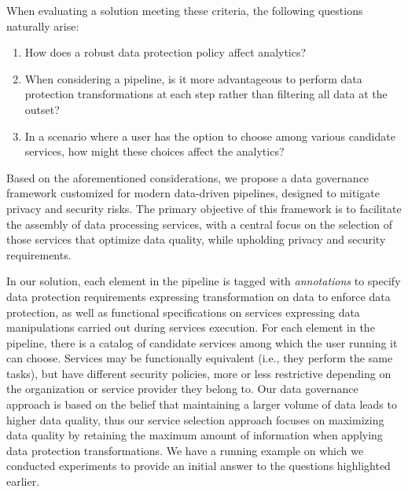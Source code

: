 When evaluating a solution meeting these criteria, the following questions naturally arise:
\begin{enumerate}
\item How does a robust data protection policy affect analytics?
\item When considering a pipeline, is it more advantageous to perform data protection transformations at each step rather than filtering all data at the outset? 
\item In a scenario where a user has the option to choose among various candidate services, how might these choices affect the analytics?
\end{enumerate}
%
Based on the aforementioned considerations, we propose a data governance framework customized for modern data-driven pipelines, designed to mitigate privacy and security risks. The primary objective of this framework is to facilitate the assembly of data processing services, with a central focus on the selection of those services that optimize data quality, while upholding privacy and security requirements. 

In our solution, each element in the pipeline is tagged with \textit{annotations} to specify data protection requirements expressing transformation on data to enforce data protection, as well as functional specifications on services expressing data manipulations carried out during services execution. For each element in the pipeline, there is a catalog of candidate services among which the user running it can choose. Services may be functionally equivalent (i.e., they perform the same tasks), but have different security policies, more or less restrictive depending on the organization or service provider they belong to.
Our data governance approach is based on the belief that maintaining a larger volume of data leads to higher data quality, thus our service selection approach focuses on maximizing data quality by retaining the maximum amount of information when applying data protection transformations. 
We have a running example on which we conducted experiments to provide an initial answer to the questions highlighted earlier.

